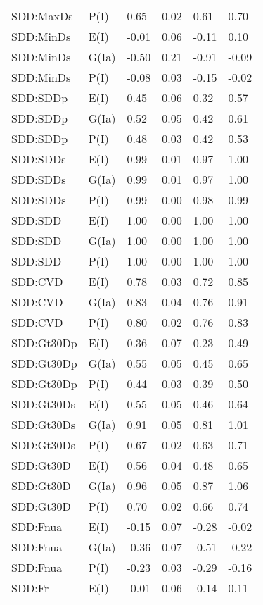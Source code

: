 \begin{center}
\begin{longtable}{|p{1.1in}|p{0.7in}|p{0.7in}|p{0.6in}|p{0.6in}|p{0.6in}|}
  SDD:MaxDs & P(I) & 0.65 & 0.02 & 0.61 & 0.70 \\ 
  SDD:MinDs & E(I) & -0.01 & 0.06 & -0.11 & 0.10 \\ 
  SDD:MinDs & G(Ia) & -0.50 & 0.21 & -0.91 & -0.09 \\ 
  SDD:MinDs & P(I) & -0.08 & 0.03 & -0.15 & -0.02 \\ 
  SDD:SDDp & E(I) & 0.45 & 0.06 & 0.32 & 0.57 \\ 
  SDD:SDDp & G(Ia) & 0.52 & 0.05 & 0.42 & 0.61 \\ 
  SDD:SDDp & P(I) & 0.48 & 0.03 & 0.42 & 0.53 \\ 
  SDD:SDDs & E(I) & 0.99 & 0.01 & 0.97 & 1.00 \\ 
  SDD:SDDs & G(Ia) & 0.99 & 0.01 & 0.97 & 1.00 \\ 
  SDD:SDDs & P(I) & 0.99 & 0.00 & 0.98 & 0.99 \\ 
  SDD:SDD & E(I) & 1.00 & 0.00 & 1.00 & 1.00 \\ 
  SDD:SDD & G(Ia) & 1.00 & 0.00 & 1.00 & 1.00 \\ 
  SDD:SDD & P(I) & 1.00 & 0.00 & 1.00 & 1.00 \\ 
  SDD:CVD & E(I) & 0.78 & 0.03 & 0.72 & 0.85 \\ 
  SDD:CVD & G(Ia) & 0.83 & 0.04 & 0.76 & 0.91 \\ 
  SDD:CVD & P(I) & 0.80 & 0.02 & 0.76 & 0.83 \\ 
  SDD:Gt30Dp & E(I) & 0.36 & 0.07 & 0.23 & 0.49 \\ 
  SDD:Gt30Dp & G(Ia) & 0.55 & 0.05 & 0.45 & 0.65 \\ 
  SDD:Gt30Dp & P(I) & 0.44 & 0.03 & 0.39 & 0.50 \\ 
  SDD:Gt30Ds & E(I) & 0.55 & 0.05 & 0.46 & 0.64 \\ 
  SDD:Gt30Ds & G(Ia) & 0.91 & 0.05 & 0.81 & 1.01 \\ 
  SDD:Gt30Ds & P(I) & 0.67 & 0.02 & 0.63 & 0.71 \\ 
  SDD:Gt30D & E(I) & 0.56 & 0.04 & 0.48 & 0.65 \\ 
  SDD:Gt30D & G(Ia) & 0.96 & 0.05 & 0.87 & 1.06 \\ 
  SDD:Gt30D & P(I) & 0.70 & 0.02 & 0.66 & 0.74 \\ 
  SDD:Fnua & E(I) & -0.15 & 0.07 & -0.28 & -0.02 \\ 
  SDD:Fnua & G(Ia) & -0.36 & 0.07 & -0.51 & -0.22 \\ 
  SDD:Fnua & P(I) & -0.23 & 0.03 & -0.29 & -0.16 \\ 
  SDD:Fr & E(I) & -0.01 & 0.06 & -0.14 & 0.11 \\ 

\end{longtable}
\end{center}
